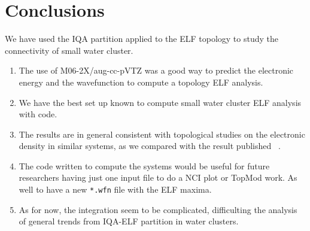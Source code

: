 \chapter{Conclusions}

We have used the IQA partition applied to the ELF topology to study
the connectivity of small water cluster.

\begin{enumerate}

\item The use of M06-2X/aug-cc-pVTZ was a good way to predict
the electronic energy and the wavefunction to compute a topology ELF
analysis.

\item We have the best set up known to compute small water cluster ELF
analysis with {} code.

\item The results are in general consistent with topological studies on 
the electronic density in similar systems, as we compared
with the result published ~\cite{tomas, Toche2016, Castor2020}.

\item The code written to compute the systems would be useful for future researchers
having just one input file to do a NCI plot or TopMod work. As well
to have a new \texttt{*.wfn} file with the ELF maxima.

\item As for now, the integration seem to be complicated, difficulting the
analysis of general trends from IQA-ELF partition in water clusters.

\end{enumerate}



